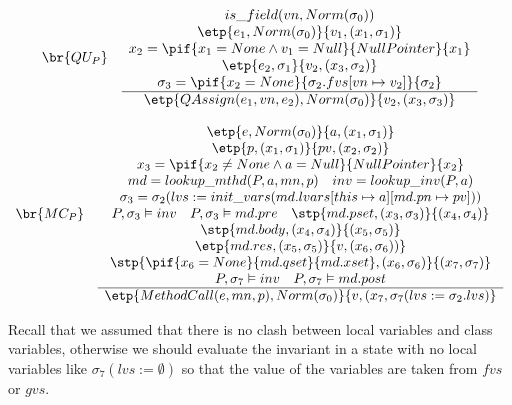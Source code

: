 \begin{displaymath}
\begin{array}{lc}
\br{QU_P}     &
\begin{array}{c}
is\_field(vn, Norm(\sigma_0))\\
\etp{e_1, Norm(\sigma_0)}{v_1, (x_1, \sigma_1)}\\
x_2 = \pif{x_1 = None \wedge v_1 = Null}{NullPointer}{x_1}\\
\etp{e_2,\sigma_1}{v_2, (x_3, \sigma_2)}\\
\sigma_3 = \pif{x_2 = None}{\sigma_2.fvs[vn \mapsto v_2]}{\sigma_2}\\
\hline
\etp{QAssign(e_1, vn, e_2), Norm(\sigma_0)}{v_2, (x_3, \sigma_3)}
\end{array}
\end{array}
\end{displaymath}



\begin{displaymath}
\begin{array}{lc}
\br{MC_P}     &
\begin{array}{c}
\etp{e,Norm(\sigma_0)}{a,(x_1,\sigma_1)}\\
\etp{p, (x_1, \sigma_1)}{pv, (x_2, \sigma_2)}\\
x_3 = \pif{x_2 \neq None \wedge a = Null}{NullPointer}{x_2}\\
md = lookup\_mthd(P, a, mn, p)\quad inv = lookup\_inv(P, a)\\
\sigma_3 = \sigma_2(lvs:=init\_vars(md.lvars[this \mapsto a][md.pn \mapsto pv]))\\
P, \sigma_3 \vDash inv\quad P, \sigma_3 \vDash md.pre\quad \stp{md.pset, (x_3, \sigma_3)}{(x_4, \sigma_4)}\\
\stp{md.body, (x_4, \sigma_4)}{(x_5, \sigma_5)}\\
\etp{md.res, (x_5, \sigma_5)}{v,(x_6, \sigma_6))}\\
\stp{\pif{x_6 = None}{md.qset}{md.xset}, (x_6, \sigma_6)}{(x_7, \sigma_7)}\\
P, \sigma_7 \vDash inv\quad P, \sigma_7 \vDash md.post\\
\hline
\etp{MethodCall(e,mn,p), Norm(\sigma_0)}{v, (x_7, \sigma_7(lvs:=\sigma_2.lvs)}\\
\end{array}
\end{array}
\end{displaymath}

Recall that we assumed that there is no clash between local variables and class variables, otherwise we
should evaluate the invariant in a state with no local variables like $\sigma_7(lvs:=\emptyset)$ so that the
value of the variables are taken from $fvs$ or $gvs$.

